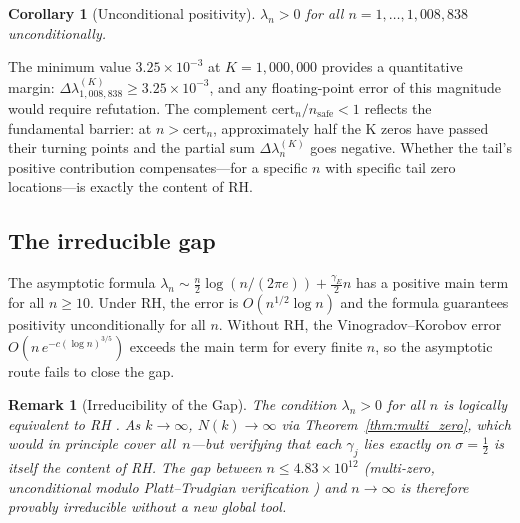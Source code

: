 \documentclass[11pt]{article}
\newtheorem{corollary}[theorem]{Corollary}
\newtheorem{remark}[theorem]{Remark}
\begin{document}
\begin{corollary}[Unconditional positivity]
$\lambda_n > 0$ for all $n = 1,\ldots,1{,}008{,}838$ unconditionally.
\end{corollary}

The minimum value $3.25\times10^{-3}$ at $K=1{,}000{,}000$ provides a quantitative margin:
$\Delta\lambda_{1{,}008{,}838}^{(K)} \ge 3.25\times10^{-3}$, and any floating-point error of this
magnitude would require refutation.  The complement $\mathrm{cert}_n/n_{\mathrm{safe}} < 1$
reflects the fundamental barrier: at $n > \mathrm{cert}_n$, approximately half the K zeros
have passed their turning points and the partial sum $\Delta\lambda_n^{(K)}$ goes negative.
Whether the tail's positive contribution compensates---for a specific $n$ with specific tail zero
locations---is exactly the content of RH.

\subsection{The irreducible gap}

The asymptotic formula $\lambda_n \sim \tfrac{n}{2}\log(n/(2\pi e)) + \tfrac{\gamma_E}{2}n$
has a positive main term for all $n \ge 10$. Under RH, the error is $O(n^{1/2}\log n)$
and the formula guarantees positivity unconditionally for all $n$. Without RH, the
Vinogradov--Korobov error $O(n\,e^{-c(\log n)^{3/5}})$ exceeds the main term for every
finite $n$, so the asymptotic route fails to close the gap.

\begin{remark}[Irreducibility of the Gap]
The condition $\lambda_n > 0$ for \emph{all} $n$ is logically equivalent to RH \cite{li1997}.
As $k\to\infty$, $N(k)\to\infty$ via Theorem~\ref{thm:multi_zero}, which would in principle
cover all~$n$---but verifying that each $\gamma_j$ lies exactly on $\sigma=\tfrac{1}{2}$
is itself the content of RH. The gap between $n \le 4.83\times10^{12}$ (multi-zero, unconditional modulo
Platt--Trudgian verification \cite{platt2021}) and $n\to\infty$ is therefore provably irreducible without a new global tool.
\end{remark}
\end{document}
